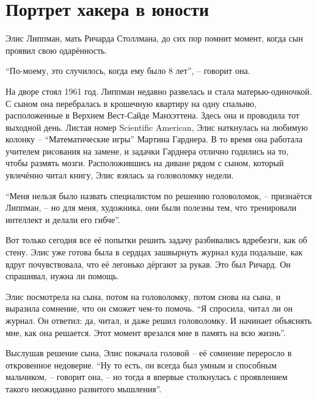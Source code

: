 
\chapter{Портрет хакера в юности}

Элис Липпман, мать Ричарда Столлмана, до сих пор помнит момент, когда сын проявил свою одарённость.

\enquote{По-моему, это случилось, когда ему было 8 лет}, -- говорит она.

На дворе стоял 1961 год. Липпман недавно развелась и стала матерью-одиночкой. С сыном она перебралась в крошечную квартиру на одну спальню, расположенные в Верхнем Вест-Сайде Манхэттена. Здесь она и проводила тот выходной день. Листая номер Scientific American, Элис наткнулась на любимую колонку -- \enquote{Математические игры} Мартина Гарднера. В то время она работала учителем рисования на замене, и задачки Гарднера отлично годились на то, чтобы размять мозги. Расположившись на диване рядом с сыном, который увлечённо читал книгу, Элис взялась за головоломку недели.

\enquote{Меня нельзя было назвать специалистом по решению головоломок, -- признаётся Липпман, -- но для меня, художника, они были полезны тем, что тренировали интеллект и делали его гибче}.

Вот только сегодня все её попытки решить задачу разбивались вдребезги, как об стену. Элис уже готова была в сердцах зашвырнуть журнал куда подальше, как вдруг почувствовала, что её легонько дёргают за рукав. Это был Ричард. Он спрашивал, нужна ли помощь.

Элис посмотрела на сына, потом на головоломку, потом снова на сына, и выразила сомнение, что он сможет чем-то помочь. \enquote{Я спросила, читал ли он журнал. Он ответил: да, читал, и даже решил головоломку. И начинает объяснять мне, как она решается. Этот момент врезался мне в память на всю жизнь}.

Выслушав решение сына, Элис покачала головой -- её сомнение переросло в откровенное недоверие. \enquote{Ну то есть, он всегда был умным и способным мальчиком, -- говорит она, -- но тогда я впервые столкнулась с проявлением такого неожиданно развитого мышления}.


